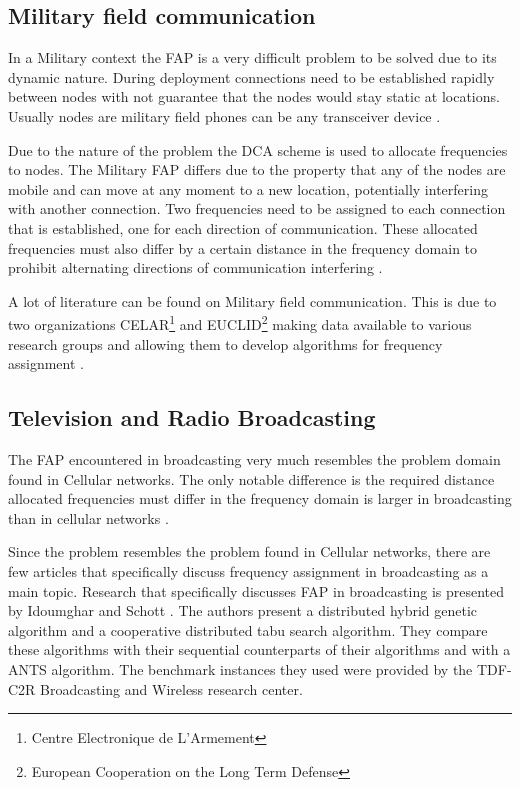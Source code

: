 \subsection{Military field communication}
In a Military context the FAP is a very difficult problem to be solved due to its dynamic nature. During deployment connections need to be established rapidly between nodes with not guarantee that the nodes would stay static at locations. Usually nodes are military field phones can be any transceiver device \cite{CALMA,DynamicFAP}. 

Due to the nature of the problem the DCA scheme is used to allocate frequencies to nodes. The Military FAP differs due to the property that any of the nodes are mobile and can move at any moment to a new location, potentially interfering with another connection\cite{CALMA,DynamicFAP}. Two frequencies need to be assigned to each connection that is established, one for each direction of communication. These allocated frequencies must also differ by a certain distance in the frequency domain to prohibit alternating directions of communication interfering\cite{CALMA,DynamicFAP} .

A lot of literature can be found on Military field communication. This is due to two organizations CELAR\footnote{Centre Electronique de L'Armement} and EUCLID\footnote{European Cooperation on the Long Term Defense} making data available to various research groups and allowing them to develop algorithms for frequency assignment \cite{CALMA,DynamicFAP}. 

\subsection{Television and Radio Broadcasting}
The FAP encountered in broadcasting very much resembles the problem domain found in Cellular networks. The only notable difference is the required distance allocated frequencies must differ in the frequency domain is larger in broadcasting than in cellular networks \cite{Karen2004}.

Since the problem resembles the problem found in Cellular networks, there are few articles that specifically discuss frequency assignment in broadcasting as a main topic. Research that specifically discusses FAP in broadcasting is presented by Idoumghar and Schott \cite{RadioFAP}. The authors present a distributed hybrid genetic algorithm and a cooperative distributed tabu search algorithm. They compare these algorithms with their sequential counterparts of their algorithms and with a ANTS algorithm. The benchmark instances they used were provided by the TDF-C2R Broadcasting and Wireless research center.
